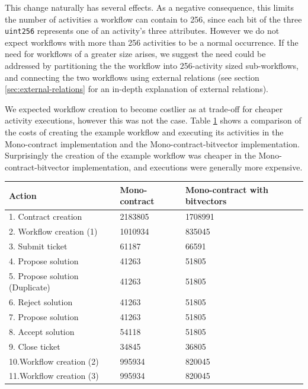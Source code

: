 \documentclass{article}
\begin{document}
		This change naturally has several effects.
		As a negative consequence, this limits the number of activities a workflow can contain to 256, since each bit of the three \texttt{uint256} represents one of an activity's three attributes.
		However we do not expect workflows with more than 256 activities to be a normal occurrence.
		If the need for workflows of a greater size arises, we suggest the need could be addressed by partitioning the the workflow into 256-activity sized sub-workflows, and connecting the two workflows using external relations (see section \ref{sec:external-relations} for an in-depth explanation of external relations).

		We expected workflow creation to become costlier as at trade-off for cheaper activity executions, however this was not the case. Table \ref{table:test-cases-bitvectors} shows a comparison of the costs of creating the example workflow and executing its activities in the Mono-contract implementation and the Mono-contract-bitvector implementation.
		Surprisingly the creation of the example workflow was cheaper in the Mono-contract-bitvector implementation, and executions were generally more expensive.
		\begin{table}
		\label{table:test-cases-bitvectors}
			\begin{tabular}{| l | l | l |}
				\hline
				Action 							& Mono-contract  & Mono-contract with bitvectors \\ \hline
				1. Contract creation			& 2183805		 & 1708991 	\\\hline
				2. Workflow creation (1)		& 1010934 		 & 835045 	\\\hline
				3. Submit ticket				& 61187			 & 66591	\\\hline
				4. Propose solution				& 41263 		 & 51805	\\\hline
				5. Propose solution (Duplicate)	& 41263 		 & 51805	\\\hline
				6. Reject solution				& 41263 		 & 51805	\\\hline
				7. Propose solution				& 41263 		 & 51805	\\\hline
				8. Accept solution				& 54118 		 & 51805	\\\hline
				9. Close ticket					& 34845 		 & 36805	\\\hline
				10.Workflow creation (2)		& 995934 		 & 820045	\\\hline
				11.Workflow creation (3)		& 995934 		 & 820045	\\\hline
				\hline
			\end{tabular}
		\end{table}
\end{document}
